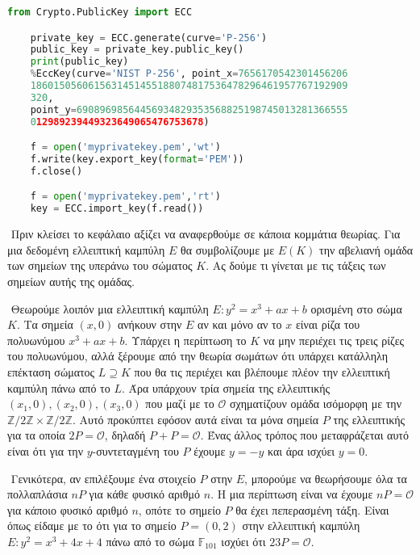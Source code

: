 \documentclass[oneside,a4paper]{article}
\begin{document}
\begin{lstlisting}[language = Python]
	from Crypto.PublicKey import ECC

	private_key = ECC.generate(curve='P-256')
	public_key = private_key.public_key()
	print(public_key)
	%EccKey(curve='NIST P-256', point_x=7656170542301456206
	1860150560615631451455188074817536478296461957767192909
	320,
	point_y=69089698564456934829353568825198745013281366555
	012989239449323649065476753678)

	f = open('myprivatekey.pem','wt')
	f.write(key.export_key(format='PEM'))
	f.close()

	f = open('myprivatekey.pem','rt')
	key = ECC.import_key(f.read())
\end{lstlisting}


$ $\newline
Πριν κλείσει το κεφάλαιο αξίζει να αναφερθούμε σε κάποια κομμάτια θεωρίας. Για μια δεδομένη ελλειπτική καμπύλη $E$ θα συμβολίζουμε με $E(K)$ την αβελιανή ομάδα των σημείων της υπεράνω του σώματος $K$. Ας δούμε τι γίνεται με τις τάξεις των σημείων αυτής της ομάδας.

$ $\newline
Θεωρούμε λοιπόν μια ελλειπτική καμπύλη $E: y^2  = x^3 + ax + b$ ορισμένη στο σώμα $K$. Τα σημεία $(x,0)$ ανήκουν στην $E$ αν και μόνο αν το $x$ είναι ρίζα του πολυωνύμου $x^3+ax+b$. Υπάρχει η περίπτωση το $K$ να μην περιέχει τις τρεις ρίζες του πολυωνύμου, αλλά ξέρουμε από την θεωρία σωμάτων ότι υπάρχει κατάλληλη επέκταση σώματος $L\supseteq K$ που θα τις περιέχει και βλέπουμε πλέον την ελλειπτική καμπύλη πάνω από το $L$. Άρα υπάρχουν τρία σημεία της ελλειπτικής $(x_1,0),(x_2,0),(x_3,0)$ που μαζί με το $\mathcal{O}$ σχηματίζουν ομάδα ισόμορφη με την $\mathbb{Z}/2\mathbb{Z} \times \mathbb{Z}/2\mathbb{Z}$. Αυτό προκύπτει εφόσον αυτά είναι τα μόνα σημεία $P$ της ελλειπτικής για τα οποία $2P = \mathcal{O}$, δηλαδή $P+P = \mathcal{O}$. Ένας άλλος τρόπος που μεταφράζεται αυτό είναι ότι για την $y$-συντεταγμένη του $P$ έχουμε $y = -y$ και άρα ισχύει $y=0$.

$ $\newline
Γενικότερα, αν επιλέξουμε ένα στοιχείο $P$ στην $E$, μπορούμε να θεωρήσουμε όλα τα πολλαπλάσια $nP$ για κάθε φυσικό αριθμό $n$. Η μια περίπτωση είναι να έχουμε $nP = \mathcal{O}$ για κάποιο φυσικό αριθμό $n$, οπότε το σημείο $P$ θα έχει πεπερασμένη τάξη. Είναι όπως είδαμε με το  ότι για το σημείο $P = (0,2)$ στην ελλειπτική καμπύλη $E: y^2  = x^3 +4x  +4$ πάνω από το σώμα $\mathbb{F}_{101}$ ισχύει ότι $23 P = \mathcal{O}$.
\end{document}

